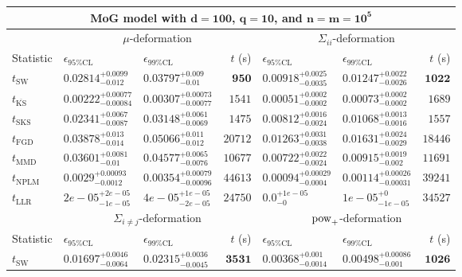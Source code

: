 \begin{tabular}{l|llr|llr}
	\toprule
	\multicolumn{7}{c}{{\bf MoG model with $\mathbf{d=100}$, $\mathbf{q=10}$, and $\mathbf{n=m=10^{5}}$}} \\
	\toprule
	\multicolumn{1}{c}{} & \multicolumn{3}{c}{$\mu$-deformation} & \multicolumn{3}{c}{$\Sigma_{ii}$-deformation} \\
	Statistic & $\epsilon_{95\%\mathrm{CL}}$ & $\epsilon_{99\%\mathrm{CL}}$ & $t$ (s) & $\epsilon_{95\%\mathrm{CL}}$ & $\epsilon_{99\%\mathrm{CL}}$ & $t$ (s) \\
	\midrule
	$t_{\mathrm{SW}}$ & $0.02814_{-0.012}^{+0.0099}$ & $0.03797_{-0.01}^{+0.009}$ & ${\mathbf{950}}$ & $0.00918_{-0.0035}^{+0.0025}$ & $0.01247_{-0.0026}^{+0.0022}$ & ${\mathbf{1022}}$ \\
	$t_{\overline{\mathrm{KS}}}$ & ${\mathbf{0.00222_{-0.00084}^{+0.00077}}}$ & ${\mathbf{0.00307_{-0.00077}^{+0.00073}}}$ & $1541$ & ${\mathbf{0.00051_{-0.0002}^{+0.0002}}}$ & ${\mathbf{0.00073_{-0.0002}^{+0.0002}}}$ & $1689$ \\
	$t_{\mathrm{SKS}}$ & $0.02341_{-0.0087}^{+0.0067}$ & $0.03148_{-0.0069}^{+0.0061}$ & $1475$ & $0.00812_{-0.0024}^{+0.0016}$ & $0.01068_{-0.0016}^{+0.0013}$ & $1557$ \\
	$t_{\mathrm{FGD}}$ & $0.03878_{-0.014}^{+0.013}$ & $0.05066_{-0.012}^{+0.011}$ & $20712$ & $0.01263_{-0.0038}^{+0.0031}$ & $0.01631_{-0.0029}^{+0.0024}$ & $18446$ \\
	$t_{\mathrm{MMD}}$ & $0.03601_{-0.01}^{+0.0081}$ & $0.04577_{-0.0076}^{+0.0065}$ & $10677$ & $0.00722_{-0.0024}^{+0.0022}$ & $0.00915_{-0.002}^{+0.0019}$ & $11691$ \\
\rowcolor{red!35}	$t_{\mathrm{NPLM}}$ & $0.0029_{-0.0012}^{+0.00093}$ & $0.00354_{-0.00096}^{+0.00079}$ & $44613$ & $0.00094_{-0.0004}^{+0.00029}$ & $0.00114_{-0.00031}^{+0.00026}$ & $39241$ \\
	$t_{\mathrm{LLR}}$ & $2e-05_{-1e-05}^{+2e-05}$ & $4e-05_{-2e-05}^{+1e-05}$ & $24750$ & $0.0_{-0}^{+1e-05}$ & $1e-05_{-1e-05}^{+0}$ & $34527$ \\
	\toprule
	\multicolumn{1}{c}{} & \multicolumn{3}{c}{$\Sigma_{i\neq j}$-deformation} & \multicolumn{3}{c}{$\rm{pow}_{+}$-deformation} \\
	Statistic & $\epsilon_{95\%\mathrm{CL}}$ & $\epsilon_{99\%\mathrm{CL}}$ & $t$ (s) & $\epsilon_{95\%\mathrm{CL}}$ & $\epsilon_{99\%\mathrm{CL}}$ & $t$ (s) \\
	\midrule
	$t_{\mathrm{SW}}$ & $0.01697_{-0.0064}^{+0.0046}$ & $0.02315_{-0.0045}^{+0.0036}$ & ${\mathbf{3531}}$ & $0.00368_{-0.0014}^{+0.001}$ & $0.00498_{-0.001}^{+0.00086}$ & ${\mathbf{1026}}$ \\

\end{tabular}
